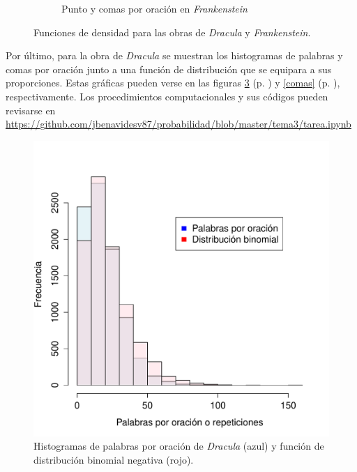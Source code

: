 \documentclass[paper=leter, fontsize=11pt]{scrartcl}
\numberwithin{equation}{section}		%
\numberwithin{figure}{section}			%
\numberwithin{table}{section}				%
\begin{document}
\begin{figure}
\begin{subfigure}{0.5\textwidth}
        \caption{Punto y comas por oración en \textit{Frankenstein}}
        \label{fra_pcomas}
    \end{subfigure}
    \caption{Funciones de densidad para las obras de \textit{Dracula} y \textit{Frankenstein}.}
    \label{densidad}
\end{figure}


Por último, para la obra de \textit{Dracula} se muestran los histogramas de palabras y comas por oración junto a una función de distribución que se equipara a sus proporciones. Estas gráficas pueden verse en las figuras \ref{palabras} (p. \pageref{palabras}) y \ref{comas} (p. \pageref{comas}), respectivamente. Los procedimientos computacionales y sus códigos pueden revisarse en \url{https://github.com/jbenavidesv87/probabilidad/blob/master/tema3/tarea.ipynb}

\begin{figure}
    \centering
    \includegraphics[width=1\textwidth]{palabras.pdf}
    \caption{Histogramas de palabras por oración de \textit{Dracula} (azul) y función de distribución binomial negativa (rojo).}
    \label{palabras}
\end{figure}
\end{document}
